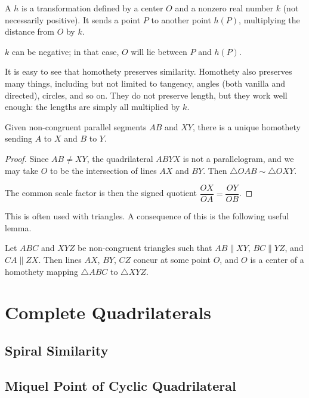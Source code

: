 \begin{definition}
A  $h$ is a transformation defined by a center $O$ and a nonzero real number $k$ (not necessarily positive). It sends a point $P$ to another point $h(P)$, multiplying the distance from $O$ by $k$.
\end{definition}

\begin{remark}
$k$ can be negative; in that case, $O$ will lie between $P$ and $h(P)$.
\end{remark}

It is easy to see that homothety preserves similarity. Homothety also preserves many things, including but not limited to tangency, angles (both vanilla and directed), circles, and so on. They do not preserve length, but they work well enough: the lengths are simply all multiplied by $k$.

\begin{proposition}
Given non-congruent parallel segments $AB$ and $XY$, there is a unique homothety sending $A$ to $X$ and $B$ to $Y$.
\end{proposition}

\begin{proof}
Since $AB \neq XY$, the quadrilateral $ABYX$ is not a parallelogram, and we may take $O$ to be the intersection of lines $AX$ and $BY$. Then $\triangle OAB\sim\triangle OXY $.

The common scale factor is then the signed quotient $\dfrac{OX}{OA}=\dfrac{OY}{OB}$.
\end{proof}

This is often used with triangles. A consequence of this is the following useful lemma.

\begin{corollary}
Let $ABC$ and $XYZ$ be non-congruent triangles such that $AB \parallel XY$, $BC \parallel YZ$, and $CA \parallel ZX$. Then lines $AX$, $BY$, $CZ$ concur at some point $O$, and $O$ is a center of a homothety mapping $\triangle ABC$ to $\triangle XYZ$.
\end{corollary}

\section{Complete Quadrilaterals}
\subsection{Spiral Similarity}
\subsection{Miquel Point of Cyclic Quadrilateral}
\pagebreak


